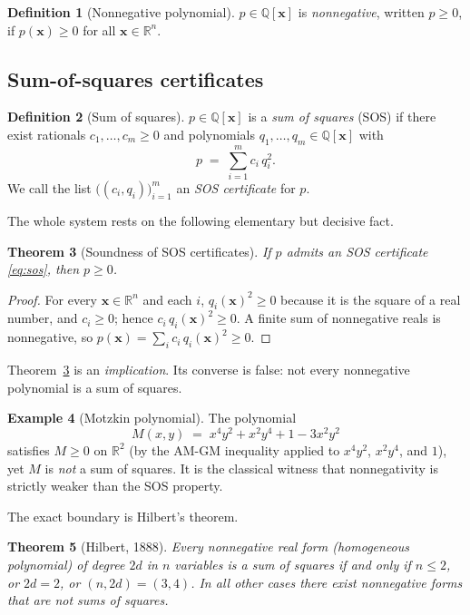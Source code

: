 \documentclass[11pt]{article}
\theoremstyle{definition}
\newtheorem{definition}{Definition}[section]
\newtheorem{example}[definition]{Example}
\theoremstyle{plain}
\newtheorem{theorem}[definition]{Theorem}
\newcommand{\R}{\mathbb{R}}
\newcommand{\Q}{\mathbb{Q}}
\newcommand{\x}{\mathbf{x}}
\begin{document}
\begin{definition}[Nonnegative polynomial]
$p \in \Q[\x]$ is \emph{nonnegative}, written $p \ge 0$, if $p(\x) \ge 0$ for all
$\x \in \R^n$.
\end{definition}

\subsection{Sum-of-squares certificates}

\begin{definition}[Sum of squares]
$p \in \Q[\x]$ is a \emph{sum of squares} (SOS) if there exist rationals
$c_1,\dots,c_m \ge 0$ and polynomials $q_1,\dots,q_m \in \Q[\x]$ with
\begin{equation}\label{eq:sos}
  p \;=\; \sum_{i=1}^{m} c_i\, q_i^{2}.
\end{equation}
We call the list $\bigl((c_i,q_i)\bigr)_{i=1}^m$ an \emph{SOS certificate} for
$p$.
\end{definition}

The whole system rests on the following elementary but decisive fact.

\begin{theorem}[Soundness of SOS certificates]\label{thm:soundness}
If $p$ admits an SOS certificate \eqref{eq:sos}, then $p \ge 0$.
\end{theorem}
\begin{proof}
For every $\x \in \R^n$ and each $i$, $q_i(\x)^2 \ge 0$ because it is the square
of a real number, and $c_i \ge 0$; hence $c_i\, q_i(\x)^2 \ge 0$. A finite sum
of nonnegative reals is nonnegative, so $p(\x) = \sum_i c_i\, q_i(\x)^2 \ge 0$.
\end{proof}

Theorem~\ref{thm:soundness} is an \emph{implication}. Its converse is false:
not every nonnegative polynomial is a sum of squares.

\begin{example}[Motzkin polynomial]\label{ex:motzkin}
The polynomial
\[
  M(x,y) \;=\; x^4 y^2 + x^2 y^4 + 1 - 3 x^2 y^2
\]
satisfies $M \ge 0$ on $\R^2$ (by the AM-GM inequality applied to $x^4y^2$,
$x^2y^4$, and $1$), yet $M$ is \emph{not} a sum of squares. It is the classical
witness that nonnegativity is strictly weaker than the SOS property.
\end{example}

The exact boundary is Hilbert's theorem.

\begin{theorem}[Hilbert, 1888]\label{thm:hilbert}
Every nonnegative real form (homogeneous polynomial) of degree $2d$ in $n$
variables is a sum of squares if and only if $n \le 2$, or $2d = 2$, or
$(n,2d) = (3,4)$. In all other cases there exist nonnegative forms that are not
sums of squares.
\end{theorem}
\end{document}
